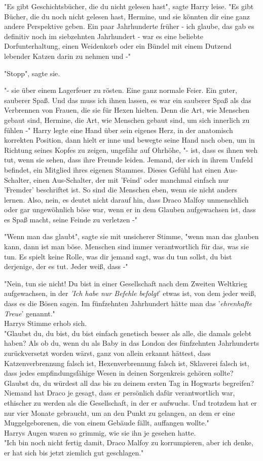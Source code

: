 {"Es gibt Geschichtsbücher, die du nicht gelesen hast", sagte Harry leise. "Es gibt Bücher, die du noch nicht gelesen hast, Hermine, und sie könnten dir eine ganz andere Perspektive geben. Ein paar Jahrhunderte früher - ich glaube, das gab es definitiv noch im siebzehnten Jahrhundert - war es eine beliebte Dorfunterhaltung, einen Weidenkorb oder ein Bündel mit einem Dutzend lebender Katzen darin zu nehmen und -"

"Stopp", sagte sie.

"- sie über einem Lagerfeuer zu rösten. Eine ganz normale Feier. Ein guter, sauberer Spaß. Und das muss ich ihnen lassen, es war ein sauberer Spaß als das Verbrennen von Frauen, die sie für Hexen hielten. Denn die Art, wie Menschen gebaut sind, Hermine, die Art, wie Menschen gebaut sind, um sich innerlich zu fühlen -" Harry legte eine Hand über sein eigenes Herz, in der anatomisch korrekten Position, dann hielt er inne und bewegte seine Hand nach oben, um in Richtung seines Kopfes zu zeigen, ungefähr auf Ohrhöhe, "- ist, dass es ihnen weh tut, wenn sie sehen, dass ihre Freunde leiden. Jemand, der sich in ihrem Umfeld befindet, ein Mitglied ihres eigenen Stammes. Dieses Gefühl hat einen Aus-Schalter, einen Aus-Schalter, der mit 'Feind' oder manchmal einfach nur 'Fremder' beschriftet ist. So sind die Menschen eben, wenn sie nicht anders lernen. Also, nein, es deutet nicht darauf hin, dass Draco Malfoy unmenschlich oder gar ungewöhnlich böse war, wenn er in dem Glauben aufgewachsen ist, dass es Spaß macht, seine Feinde zu verletzen -"

"Wenn man das glaubt", sagte sie mit unsicherer Stimme, "wenn man das glauben kann, dann ist man böse. Menschen sind immer verantwortlich für das, was sie tun. Es spielt keine Rolle, was dir jemand sagt, was du tun sollst, du bist derjenige, der es tut. Jeder weiß, dass -"

"Nein, tun sie nicht! Du bist in einer Gesellschaft nach dem Zweiten Weltkrieg aufgewachsen, in der \emph{'Ich habe nur Befehle befolgt}' etwas ist, von dem jeder weiß, dass es die Bösen sagen. Im fünfzehnten Jahrhundert hätte man das '\emph{ehrenhafte Treue}' genannt."\\ Harrys Stimme erhob sich.\\ "Glaubst du, du bist, du bist einfach genetisch besser als alle, die damals gelebt haben? Als ob du, wenn du als Baby in das London des fünfzehnten Jahrhunderts zurückversetzt worden wärst, ganz von allein erkannt hättest, dass Katzenverbrennung falsch ist, Hexenverbrennung falsch ist, Sklaverei falsch ist, dass jedes empfindungsfähige Wesen in deinen Sorgenkreis gehören sollte? Glaubst du, du würdest all das bis zu deinem ersten Tag in Hogwarts begreifen? Niemand hat Draco je gesagt, dass er persönlich dafür verantwortlich war, ethischer zu werden als die Gesellschaft, in der er aufwuchs. Und trotzdem hat er nur vier Monate gebraucht, um an den Punkt zu gelangen, an dem er eine Muggelgeborenen, die von einem Gebäude fällt, auffangen wollte."\\ Harrys Augen waren so grimmig, wie sie ihn je gesehen hatte.\\ "Ich bin noch nicht fertig damit, Draco Malfoy zu korrumpieren, aber ich denke, er hat sich bis jetzt ziemlich gut geschlagen."

}
